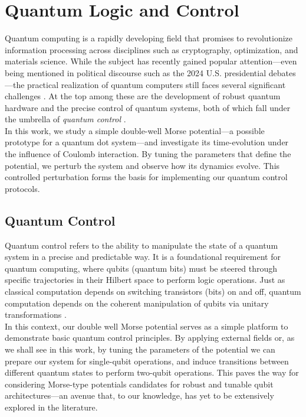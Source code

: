 \documentclass{subfiles}
\begin{document}
\section{Quantum Logic and Control}
Quantum computing is a rapidly developing field that promises to revolutionize information processing across disciplines such as cryptography, optimization, and materials science. While the subject has recently gained popular attention—even being mentioned in political discourse such as the 2024 U.S. presidential debates—the practical realization of quantum computers still faces several significant challenges \cite{lau2022nisq}. At the top among these are the development of robust quantum hardware and the precise control of quantum systems, both of which fall under the umbrella of \emph{quantum control} \cite{huang1983controllability, d2021introduction}. \\ 

In this work, we study a simple double-well Morse potential—a possible prototype for a quantum dot system—and investigate its time-evolution under the influence of Coulomb interaction. By tuning the parameters that define the potential, we perturb the system and observe how its dynamics evolve. This controlled perturbation forms the basis for implementing our quantum control protocols.
\subsection{Quantum Control}
Quantum control refers to the ability to manipulate the state of a quantum system in a precise and predictable way. It is a foundational requirement for quantum computing, where qubits (quantum bits) must be steered through specific trajectories in their Hilbert space to perform logic operations. Just as classical computation depends on switching transistors (bits) on and off, quantum computation depends on the coherent manipulation of qubits via unitary transformations \cite{nielsen2010quantum}. \\ 
In this context, our double well Morse potential serves as a simple platform to demonstrate basic quantum control principles. By applying external fields or, as we shall see in this work, by tuning the parameters of the potential we can prepare our system for single-qubit operations, and induce transitions between different quantum states to perform two-qubit operations. This paves the way for considering Morse-type potentials candidates for robust and tunable qubit architectures—an avenue that, to our knowledge, has yet to be extensively explored in the literature.
\end{document}
